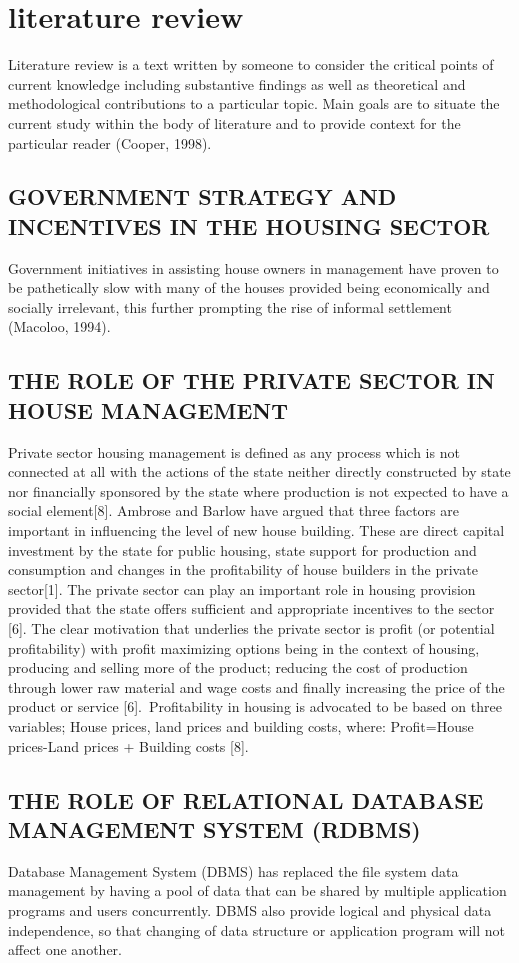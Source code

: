 \documentclass[]{report}
\begin{document}
\chapter{literature review}
Literature review is a text written by someone to consider the critical points of current knowledge including substantive findings as well as theoretical and methodological contributions to a particular topic. Main goals are to situate the current study within the body of literature and to provide context for the particular reader (Cooper, 1998).

\section{GOVERNMENT STRATEGY AND INCENTIVES IN THE HOUSING SECTOR} 
Government initiatives in assisting house owners in management have proven to be pathetically slow with many of the houses provided being economically and socially irrelevant, this further prompting the rise of informal settlement (Macoloo, 1994).
\section{THE ROLE OF THE PRIVATE SECTOR IN HOUSE MANAGEMENT}
Private sector housing management is defined as any process which is not connected at all with the actions of the state neither directly constructed by state nor financially sponsored by the state where production is not expected to have a social element[8].
Ambrose and Barlow have argued that three factors are important in influencing the level of new house building. These are direct capital investment by the state for public housing, state support for production and consumption and changes in the profitability of house builders in the private sector[1].
The private sector can play an important role in housing provision provided that the state offers sufficient and appropriate incentives to the sector [6].
The clear motivation that underlies the private sector is profit (or potential profitability) with profit maximizing options being in the context of housing, producing and selling more of the product; reducing the cost of production through lower raw material and wage costs and finally increasing the price of the product or service [6].\
Profitability in housing is advocated to be based on three variables; House prices, land prices and building costs, where:
Profit=House prices-{Land prices + Building costs} [8].

\section{THE ROLE OF RELATIONAL DATABASE MANAGEMENT SYSTEM (RDBMS)}
Database Management System (DBMS) has replaced the file system data management by having a pool of data that can be shared by multiple application programs and users concurrently. DBMS also provide logical and physical data independence, so that changing of data structure or application program will not affect one another.
\end{document}
